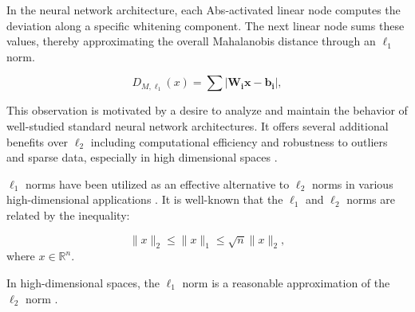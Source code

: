 In the neural network architecture, each Abs-activated linear node computes the deviation along a specific whitening component. The next linear node sums these values, thereby approximating the overall Mahalanobis distance through an $\ell_1$ norm. 

\begin{equation}
    \label{eq:mahalanobis_L1}
    D_{M,\ell_1}(x) = \sum \left| \mathbf{W_i} \mathbf{x} - \mathbf{b_i} \right|,
\end{equation}

This observation is motivated by a desire to analyze and maintain the behavior of well-studied standard neural network architectures. It offers several additional benefits over $\ell_2$ including computational efficiency and robustness to outliers and sparse data, especially in high dimensional spaces \cite{boyd2004convex, horn2012matrix}.

$\ell_1$ norms have been utilized as an effective alternative to $\ell_2$ norms in various high-dimensional applications \citep{bernhardsson2018annoy, tibshirani1996lasso}. It is well-known that the $\ell_1$ and $\ell_2$ norms are related by the inequality:

\[
\|x\|_2 \leq \|x\|_1 \leq \sqrt{n} \|x\|_2,
\]
where \( x \in \mathbb{R}^n \). 

In high-dimensional spaces, the $\ell_1$ norm is a reasonable approximation of the $\ell_2$ norm \cite{vershynin2018high}. 
